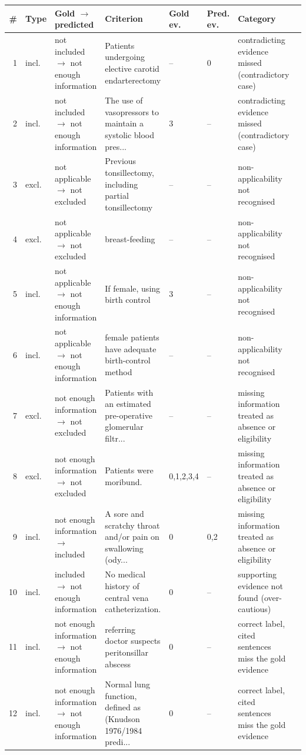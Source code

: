 \begin{tabular}{rllp{2.6cm}llll}\toprule
\# & Type & Gold $\rightarrow$ predicted & Criterion & Gold ev. & Pred. ev. & Category \\ \midrule
1 & incl. & not included $\rightarrow$ not enough information & Patients undergoing elective carotid endarterectomy & -- & 0 & contradicting evidence missed (contradictory case) \\
2 & incl. & not included $\rightarrow$ not enough information & The use of vasopressors to maintain a systolic blood pres... & 3 & -- & contradicting evidence missed (contradictory case) \\
3 & excl. & not applicable $\rightarrow$ not excluded & Previous tonsillectomy, including partial tonsillectomy & -- & -- & non-applicability not recognised \\
4 & excl. & not applicable $\rightarrow$ not excluded & breast-feeding & -- & -- & non-applicability not recognised \\
5 & incl. & not applicable $\rightarrow$ not enough information & If female, using birth control & 3 & -- & non-applicability not recognised \\
6 & incl. & not applicable $\rightarrow$ not enough information & female patients have adequate birth-control method & -- & -- & non-applicability not recognised \\
7 & excl. & not enough information $\rightarrow$ not excluded & Patients with an estimated pre-operative glomerular filtr... & -- & -- & missing information treated as absence or eligibility \\
8 & excl. & not enough information $\rightarrow$ not excluded & Patients were moribund. & 0,1,2,3,4 & -- & missing information treated as absence or eligibility \\
9 & incl. & not enough information $\rightarrow$ included & A sore and scratchy throat and/or pain on swallowing (ody... & 0 & 0,2 & missing information treated as absence or eligibility \\
10 & incl. & included $\rightarrow$ not enough information & No medical history of central vena catheterization. & 0 & -- & supporting evidence not found (over-cautious) \\
11 & incl. & not enough information $\rightarrow$ not enough information & referring doctor suspects peritonsillar abscess & 0 & -- & correct label, cited sentences miss the gold evidence \\
12 & incl. & not enough information $\rightarrow$ not enough information & Normal lung function, defined as (Knudson 1976/1984 predi... & 0 & -- & correct label, cited sentences miss the gold evidence \\
\bottomrule\end{tabular}